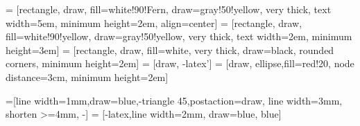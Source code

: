\usetikzlibrary{shapes,arrows,shadows}
\usetikzlibrary{chains,decorations.pathmorphing,positioning,fit}
\usetikzlibrary{decorations.shapes,calc,backgrounds}
\usetikzlibrary{decorations.text,matrix}
\usetikzlibrary{calc}
\usetikzlibrary{mindmap}
\usetikzlibrary{fadings}
\usetikzlibrary{positioning}


 = [rectangle, draw, fill=white!90!Fern, draw=gray!50!yellow, very thick,
    text width=5em, minimum height=2em, align=center]
 = [rectangle, draw, fill=white!90!yellow, draw=gray!50!yellow, very thick,
    text width=2em, minimum height=3em]
 = [rectangle, draw, fill=white, very thick, draw=black,
 rounded corners, minimum height=2em] %
 = [draw, -latex']
 = [draw, ellipse,fill=red!20, node distance=3cm,
    minimum height=2em]

=[line width=1mm,draw=blue,-triangle 45,postaction={draw, line width=3mm, shorten >=4mm, -}]
 = [-latex,line width=2mm, draw=blue, blue]
